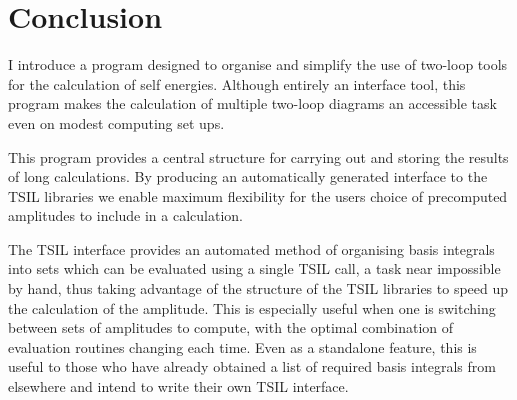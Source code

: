 \section{Conclusion}

I introduce a program designed to organise and simplify the use of two-loop tools for the calculation of self energies.  Although entirely an interface tool, this program makes the calculation of multiple two-loop diagrams an accessible task even on modest computing set ups.

This program provides a central structure for carrying out and storing the results of long calculations.  By producing an automatically generated interface to the TSIL libraries we enable maximum flexibility for the users choice of precomputed amplitudes to include in a calculation.

The TSIL interface provides an automated method of organising basis integrals into sets which can be evaluated using a single TSIL call, a task near impossible by hand, thus taking advantage of the structure of the TSIL libraries to speed up the calculation of the amplitude.  This is especially useful when one is switching between sets of amplitudes to compute, with the optimal combination of evaluation routines changing each time. Even as a standalone feature, this is useful to those who have already obtained a list of required basis integrals from elsewhere and intend to write their own TSIL interface.




{}


  
